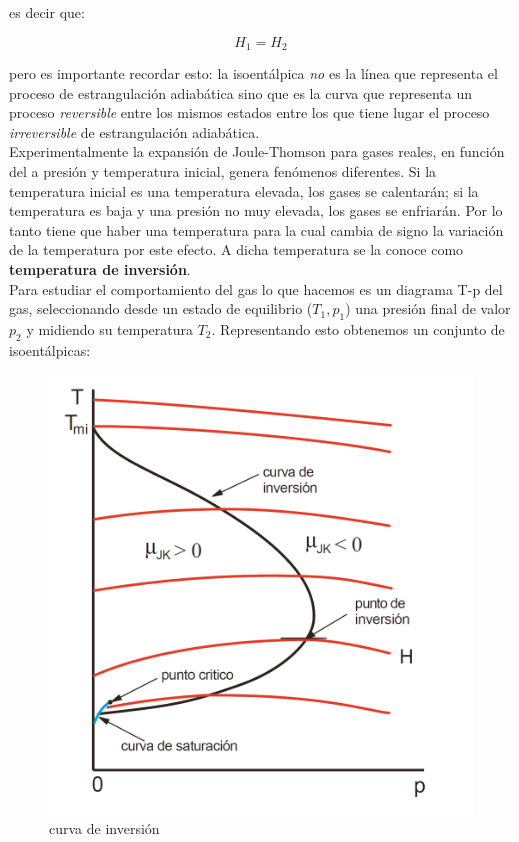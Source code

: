 \documentclass[12pt]{book}
\begin{document}
es decir que:

\begin{equation}
H_1 = H_2
\end{equation}

pero es importante recordar esto: la isoentálpica \textit{no} es la línea que representa el proceso de estrangulación adiabática sino que es la curva que representa un proceso \textit{reversible} entre los mismos estados entre los que tiene lugar el proceso \textit{irreversible} de estrangulación adiabática. \\

Experimentalmente la expansión de Joule-Thomson para gases reales, en función del a presión y temperatura inicial, genera fenómenos diferentes. Si la temperatura inicial es una temperatura elevada, los gases se calentarán; si la temperatura es baja y una presión no muy elevada, los gases se enfriarán. Por lo tanto tiene que haber una temperatura para la cual cambia de signo la variación de la temperatura por este efecto. A dicha temperatura se la conoce como \textbf{temperatura de inversión}.\\

Para estudiar el comportamiento del gas lo que hacemos es un diagrama T-p del gas, seleccionando desde un estado de equilibrio ($T_1,p_1$) una presión final de valor $p_2$ y midiendo su temperatura $T_2$. Representando esto obtenemos un conjunto de isoentálpicas:

\begin{figure}[h!] \centering
\includegraphics[scale=0.3]{isoentalpicas.png}
\caption{curva de inversión}
\end{figure}
\end{document}

